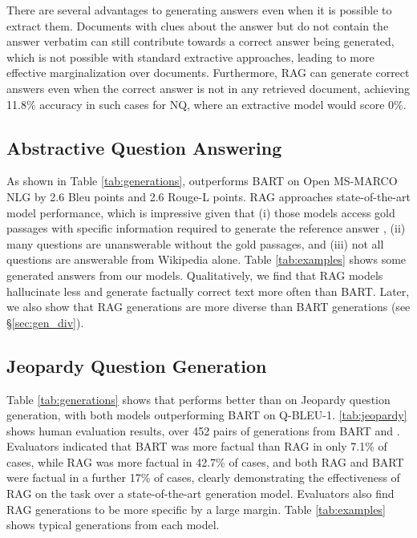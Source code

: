 \documentclass{article}
\begin{document}
There are several advantages to generating answers even when it is possible to extract them. Documents with clues about the answer but do not contain the answer verbatim can still contribute towards a correct answer being generated, which is not possible with standard extractive approaches, leading to more effective marginalization over documents. 
Furthermore, RAG can generate correct answers even when the correct answer is not in any retrieved document, achieving 11.8\% accuracy in such cases for NQ, where an extractive model would score 0\%. 


\subsection{Abstractive Question Answering}

As shown in Table \ref{tab:generations}, \raganswer{} outperforms BART on Open MS-MARCO NLG by 2.6 Bleu points and 2.6 Rouge-L points. 
RAG approaches state-of-the-art model performance, which is impressive given that (i) those models access gold passages with specific information required to generate the reference answer
, (ii) many questions are unanswerable without the gold passages, and (iii) not all questions are answerable from Wikipedia alone. Table \ref{tab:examples} shows some generated answers from our models. Qualitatively, we find that RAG models hallucinate less and generate factually correct text more often than BART. Later, we also show that RAG generations are more diverse than BART generations (see \S\ref{sec:gen_div}). 

\subsection{Jeopardy Question Generation}
\label{sec:fact_generation_results}
Table \ref{tab:generations} shows that \ragtoken{} performs better than \raganswer{} on Jeopardy question generation, with both models outperforming BART on Q-BLEU-1.
 \ref{tab:jeopardy} shows human evaluation results, over 452 pairs of generations from BART and \ragtoken{}. Evaluators indicated that BART was more factual than RAG in only 7.1\% of cases, while RAG was more factual in 42.7\% of cases, and both RAG and BART were factual in a further 17\% of cases, clearly demonstrating the effectiveness of RAG on the task over a state-of-the-art generation model. Evaluators also find RAG generations to be more specific by a large margin. Table \ref{tab:examples} shows typical generations from each model.
\end{document}

